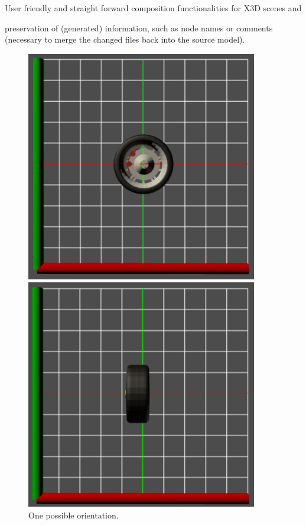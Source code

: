 \begin{itemize*}
  \item User friendly and straight forward composition functionalities for \gls{X3D} scenes and
  \item preservation of (generated) information, such as node names or comments (necessary to merge the changed files back into the source model).
\end{itemize*}

\begin{figure}
  \begin{minipage}{.5\textwidth}
    \includegraphics[width=0.9\textwidth]{../assets/wheel1.png}
  	\caption{One possible orientation.}
  	\label{fig:wheel1}
  \end{minipage}
  \begin{minipage}{.5\textwidth}
  	\includegraphics[width=0.9\textwidth]{../assets/wheel2.png}

\end{minipage}
\end{figure}
